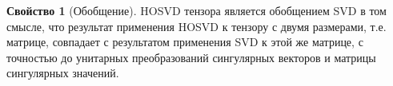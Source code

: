 \documentclass[specialist,
    substylefile = spbu.rtx,
    subf,href,colorlinks=true, 12pt]{disser}
\theoremstyle{plain}
\theoremstyle{definition}
\newtheorem{definition}{Определение}[section]
\newtheorem{property}{Свойство}[section]
\theoremstyle{remark}
\newtheorem*{remark}{Замечание}
\begin{document}
    \begin{property}[Обобщение]
        HOSVD тензора является обобщением SVD в том смысле, что 
        результат применения HOSVD к тензору с двумя размерами, т.е. матрице, совпадает
        с результатом применения SVD к этой же матрице, с точностью до унитарных преобразований сингулярных векторов и
        матрицы сингулярных значений.
    \end{property}

%


%
\end{document}
